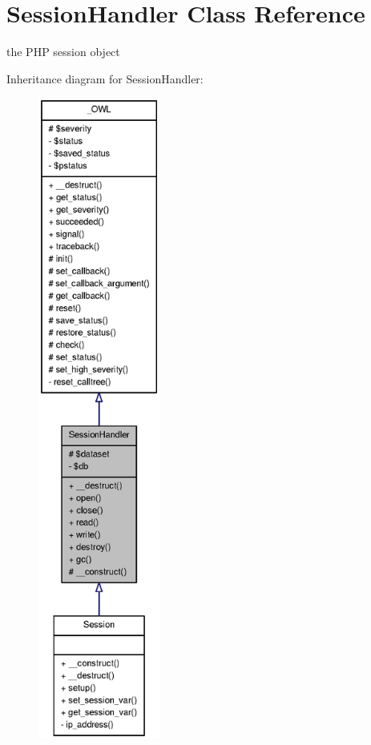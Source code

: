 \section{SessionHandler Class Reference}
\label{classSessionHandler}


the PHP session object  




Inheritance diagram for SessionHandler:
\nopagebreak
\begin{figure}[H]
\begin{center}
\leavevmode
\includegraphics[height=600pt]{classSessionHandler__inherit__graph}
\end{center}
\end{figure}


